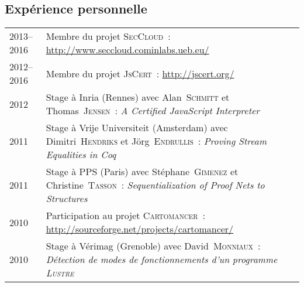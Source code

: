 \documentclass[12pt,a4paper]{article}
\makeatletter
\newcommand{\en}[1]{\foreignlanguage{english}{{#1}}}
\newcommand{\en}[1]{\foreignlanguage{english}{{#1}}}
\newenvironment{datecvsection}[1]%
               {\subsection*{#1}%
                 \noindent \begin{tabular}{@{}p{\annee}p{\texte}@{}}}
               {\end{tabular}}
\newcommand\familyName{\textsc}
\newcommand\placeName{}
\makeatother
\begin{document}
\begin{datecvsection}{Expérience personnelle}

	2013–2016 & Membre du projet \textsc{SecCloud}~:  \url{http://www.seccloud.cominlabs.ueb.eu/} \\

	2012–2016 & Membre du projet \textsc{JsCert}~:  \url{http://jscert.org/} \\

    2012 & Stage à \placeName{Inria} (\placeName{Rennes}) avec Alan~\familyName{Schmitt} et Thomas~\familyName{Jensen}~:
	\en{\textit{A Certified JavaScript Interpreter}} \\

    2011 & Stage à \placeName{Vrĳe Universiteit} (\placeName{Amsterdam}) avec Dimitri~\familyName{Hendriks} et Jörg~\familyName{Endrullis}~:
	\en{\textit{Proving Stream Equalities in Coq}} \\

    2011 & Stage à \placeName{PPS} (\placeName{Paris}) avec Stéphane~\familyName{Gimenez} et Christine~\familyName{Tasson}~:
	\en{\textit{Sequentialization of Proof Nets to Structures}} \\

	2010 & Participation au projet \textsc{Cartomancer}~:  \url{http://sourceforge.net/projects/cartomancer/} \\

    2010 & Stage à \placeName{Vérimag} (\placeName{Grenoble}) avec David~\familyName{Monniaux}~:
	\textit{Détection de modes de fonctionnements d’un programme \textsc{Lustre}} \\

\end{datecvsection}
\end{document}
